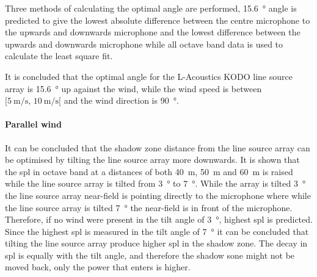 Three methods of calculating the optimal angle are performed, \SI{15.6}{\degree} angle is predicted to give the lowest absolute difference between the centre microphone to the upwards and downwards microphone and the lowest difference between the upwards and downwards microphone while all octave band data is used to calculate the least square fit.

It is concluded that the optimal angle for the L-Acoustics KODO line source array is \SI{15.6}{\degree} up against the wind, while the wind speed is between $[\SI{5}{\meter\per\second},\, \SI{10}{\meter\per\second}[ $ and the wind direction is \SI{90}{\degree}.





\paragraph{Parallel wind}
It can be concluded that the shadow zone distance from the line source array can be optimised by tilting the line source array more downwards. It is shown that the \gls{spl} in octave band at a distances of both \SI{40}{\meter}, \SI{50}{\meter} and \SI{60}{\meter} is raised while the line source array is tilted from \SI{3}{\degree} to \SI{7}{\degree}. While the array is tilted \SI{3}{\degree} the line source array near-field is pointing directly to the microphone where while the line source array is tilted \SI{7}{\degree} the near-field is in front of the microphone. Therefore, if no wind were present in the tilt angle of \SI{3}{\degree}, highest \gls{spl} is predicted. Since the highest \gls{spl} is measured in the tilt angle of \SI{7}{\degree} it can be concluded that tilting the line source array produce higher \gls{spl} in the shadow zone. The decay in \gls{spl} is equally with the tilt angle, and therefore the shadow sone might not be moved back, only the power that enters is higher.  





